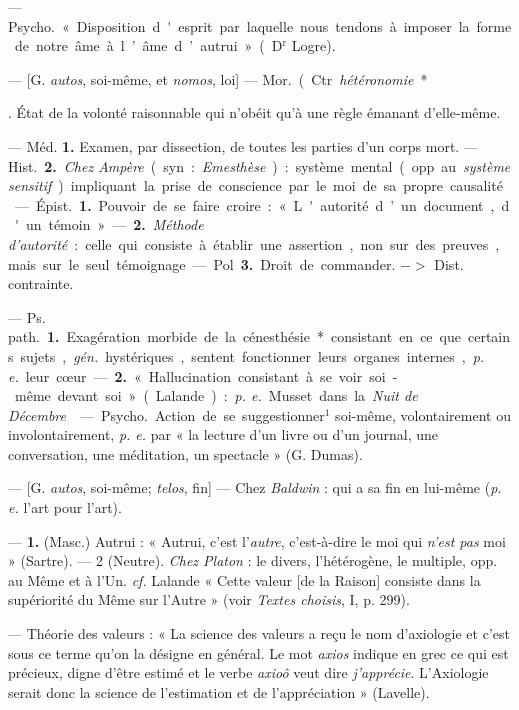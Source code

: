 \begin{itemize}[leftmargin=1cm, label=, itemsep=1pt]
{ — \si{Psycho.} « Disposition d'esprit par laquelle nous
tendons à imposer la forme de notre
âme à l’âme d’autrui » (D$^\text{r}$ Logre).

 — [G. {\it autos}, soi-même, et
{\it nomos}, loi] — \si{Mor.} (Ctr. {\it hétéronomie}*}. État de la volonté
raisonnable qui n’obéit qu'à une règle
émanant d’elle-même.

 — Méd. {\bf 1.} Examen, par dissection, de toutes les parties d’un
corps mort. — \si{Hist.} {\bf 2.} {\it Chez Ampère}
(syn. : {\it Emesthèse}) : système mental
(opp. au {\it système sensitif}) impliquant
la prise de conscience par le moi de
sa propre causalité.

 — \si{Épist.} {\bf 1.} Pouvoir de se
faire croire : « L'autorité d’un document, d'un témoin ». — {\bf 2.} {\it Méthode
d'autorité} : celle qui consiste à établir
une assertion, non sur des preuves,
mais sur le seul témoignage.

— Pol. {\bf 3.} Droit de commander.
$->$ Dist. contrainte.

 — \si{Ps. path.} {\bf 1.} Exagération morbide de
la cénesthésie* consistant en ce que certains sujets,  {\it gén.}
hystériques, sentent fonctionner
leurs organes internes, {\it p. e.} leur
cœur. — {\bf 2.} « Hallucination consistant à se voir soi-même devant soi »
(Lalande) : {\it p. e.} Musset dans la {\it Nuit
de Décembre}.

 — \si{Psycho.} Action
de se suggestionner$^1$ soi-même, volontairement ou involontairement,
{\it p. e.} par « la lecture d’un livre ou
d’un journal, une conversation, une
méditation, un spectacle » (G.
Dumas).

 — [G. {\it autos}, soi-même; {\it telos},
fin] — Chez {\it Baldwin} : qui a sa fin
en lui-même ({\it p. e.} l’art pour l’art).

 — {\bf 1.} (Masc.) Autrui :
« Autrui, c’est l’{\it autre}, c’est-à-dire
le moi qui {\it n’est pas} moi » (Sartre). —
2 (Neutre). {\it Chez Platon} : le divers,
l’hétérogène, le multiple, opp. au
Même et à l’Un. {\it cf.}  Lalande
« Cette valeur [de la Raison] consiste
dans la supériorité du Même sur
l'Autre » (voir {\it Textes choisis}, I,
p. 299).

 — Théorie des valeurs : « La
science des valeurs a reçu le nom
d’axiologie et c'est sous ce terme
qu’on la désigne en général. Le mot
{\it axios} indique en grec ce qui est précieux, digne d'être estimé et le
verbe {\it axioô} veut dire {\it j'apprécie}.
L’Axiologie serait donc la science
de l’estimation et de l’appréciation »
(Lavelle).


\end{itemize}

